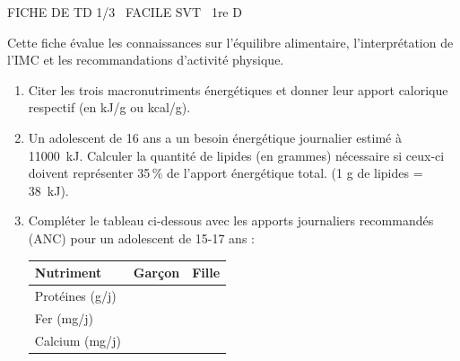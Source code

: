 \documentclass[11pt]{article}
\begin{document}
\begin{tcolorbox}[enhanced,colback=popink,colframe=popink,arc=10pt,boxrule=0pt,left=12pt,right=12pt,top=9pt,bottom=9pt]
{\color{white}\popxbold\small FICHE DE TD 1/3 \textbullet\ FACILE \hfill SVT \textbullet\ 1re D\par}
\end{tcolorbox}
\vspace{4pt}
Cette fiche évalue les connaissances sur l'équilibre alimentaire, l'interprétation de l'IMC et les recommandations d'activité physique.

\begin{exercice}
\begin{enumerate}
    \item Citer les trois macronutriments énergétiques et donner leur apport calorique respectif (en kJ/g ou kcal/g).
    \item Un adolescent de 16 ans a un besoin énergétique journalier estimé à \SI{11000}{\kilo\joule}. Calculer la quantité de lipides (en grammes) nécessaire si ceux-ci doivent représenter 35\,\% de l'apport énergétique total. (1 g de lipides = \SI{38}{\kilo\joule}).
    \item Compléter le tableau ci-dessous avec les apports journaliers recommandés (ANC) pour un adolescent de 15-17 ans :
    \begin{center}
    \begin{tabular}{|l|c|c|}
    \hline
    \textbf{Nutriment} & \textbf{Garçon} & \textbf{Fille} \\
    \hline
    Protéines (g/j) & & \\
    \hline
    Fer (mg/j) & & \\
    \hline
    Calcium (mg/j) & & \\
    \hline
    \end{tabular}
    \end{center}
\end{enumerate}
\end{exercice}
\end{document}
